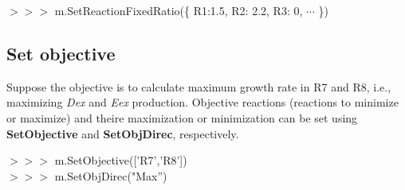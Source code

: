 \begin{framed}
$>>>$ m.SetReactionFixedRatio(\{ R1:1.5, R2: 2.2, R3: 0, $\cdots$ \})
\end{framed}


\subsection{Set objective}
Suppose the objective is to calculate maximum growth rate in R7 and R8, i.e., maximizing \textit{Dex} and \textit{Eex} production. Objective reactions (reactions to minimize or maximize) and theire maximization or minimization can be set using \textbf{SetObjective} and \textbf{SetObjDirec}, respectively.

\begin{framed}
$>>>$ m.SetObjective(['R7','R8'])\\
$>>>$ m.SetObjDirec("Max'')
\end{framed}
